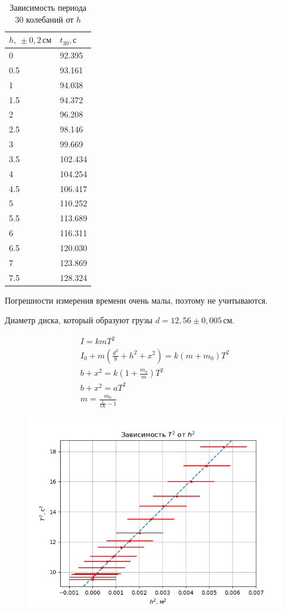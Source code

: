 \begin{table}[!ht]
    \centering
    \caption{Зависимость периода 30 колебаний от $h$}
    \begin{tabular}{|l|l|}
    \hline
        $h,\,\pm 0{,}2\,\text{см}$ & $t_{30},\text{с}$ \\ \hline
        0 & 92.395 \\ \hline
        0.5 & 93.161 \\ \hline
        1 & 94.038 \\ \hline
        1.5 & 94.372 \\ \hline
        2 & 96.208 \\ \hline
        2.5 & 98.146 \\ \hline
        3 & 99.669 \\ \hline
        3.5 & 102.434 \\ \hline
        4 & 104.254 \\ \hline
        4.5 & 106.417 \\ \hline
        5 & 110.252 \\ \hline
        5.5 & 113.689 \\ \hline
        6 & 116.311 \\ \hline
        6.5 & 120.030 \\ \hline
        7 & 123.869 \\ \hline
        7.5 & 128.324 \\ \hline
    \end{tabular}
\end{table}

Погрешности измерения времени очень малы, поэтому не учитываются.

Диаметр диска, который образуют грузы $d=12{,}56\pm 0{,}005\,\text{см}$.

\begin{gather*}
    I=kmT^2 \\
    I_0+m\left(\frac{d^2}{8}+h^2+x^2\right)=k\left(m+m_0\right)T^2 \\
    b + x^2 = k\left(1+\frac{m_0}{m}\right)T^2 \\
    b + x^2 = aT^2 \\
    m = \frac{m_0}{\frac{1}{kK}-1} 
\end{gather*}

\begin{figure}[ht!]
    \centering\includegraphics[width=0.8\linewidth]{img/cool-plot.png}
\end{figure}

